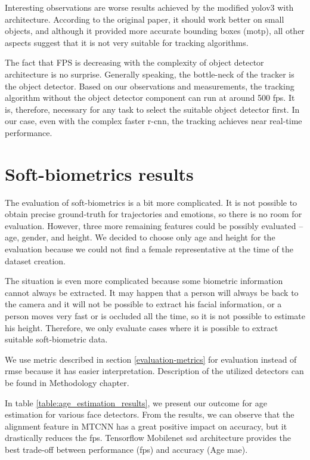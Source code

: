     Interesting observations are worse results achieved by the modified \gls{yolo}v3 with  architecture. According to the original paper, it should work better on small objects, and although it provided more accurate bounding boxes (\gls{motp}), all other aspects suggest that it is not very suitable for tracking algorithms.  
    
    The fact that FPS is decreasing with the complexity of object detector architecture is no surprise. Generally speaking, the bottle-neck of the tracker is the object detector. Based on our observations and measurements, the tracking algorithm without the object detector component can run at around 500 \gls{fps}. It is, therefore, necessary for any task to select the suitable object detector first. In our case, even with the complex \gls{faster r-cnn}, the tracking achieves near real-time performance.
    
\section{Soft-biometrics results}
    The evaluation of soft-biometrics is a bit more complicated. It is not possible to obtain precise ground-truth for trajectories and emotions, so there is no room for evaluation. However, three more remaining features could be possibly evaluated -- age, gender, and height. We decided to choose only age and height for the evaluation because we could not find a female representative at the time of the dataset creation. 
    
    The situation is even more complicated because some biometric information cannot always be extracted. It may happen that a person will always be back to the camera and it will not be possible to extract his facial information, or a person moves very fast or is occluded all the time, so it is not possible to estimate his height. Therefore, we only evaluate cases where it is possible to extract suitable soft-biometric data.
    
    We use  metric described in section \ref{evaluation-metrics} for evaluation instead of \gls{rmse} because it has easier interpretation. Description of the utilized detectors can be found in Methodology chapter. 
    
    In table \ref{table:age_estimation_results}, we present our outcome for age estimation for various face detectors. From the results, we can observe that the alignment feature in MTCNN has a great positive impact on accuracy, but it drastically reduces the \gls{fps}. Tensorflow Mobilenet \gls{ssd} architecture provides the best trade-off between performance (\gls{fps}) and accuracy (Age \gls{mae}).

